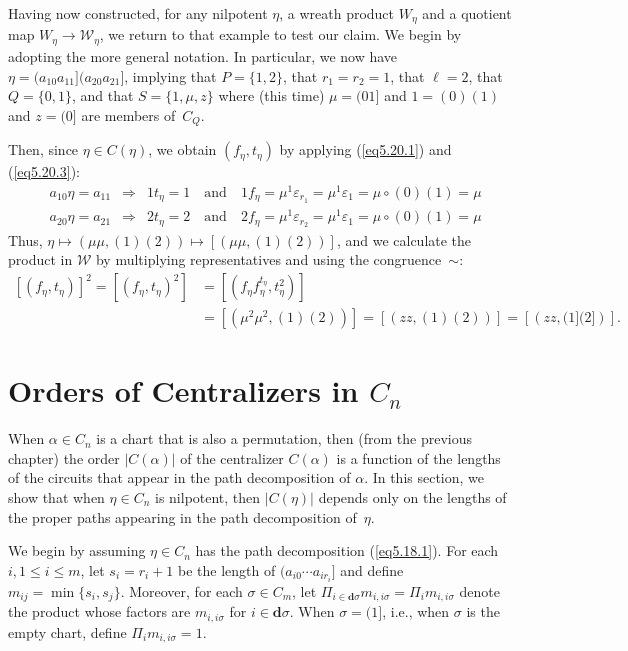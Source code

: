 \documentclass{surv-l}
\numberwithin{equation}{section}
\numberwithin{table}{section}
\numberwithin{figure}{section}
\theoremstyle{plain}
\theoremstyle{definition}
\begin{document}
Having now constructed, for any nilpotent $\eta$, a wreath product
$W_{\eta}$ and a quotient map $W_{\eta}\rightarrow
\mathcal{W}_{\eta}$, we return to that example to test our claim.
We begin by adopting the more general notation. In particular, we
now have $\eta=(a_{10}a_{11}](a_{20}a_{21}]$, implying that
$P=\{1,2\}$, that $r_{1}=r_{2}=1$, that $\ell=2$, that
$Q=\{0,1\}$, and that $S=\{1, \mu, z\}$ where (this time)
$\mu=(01]$ and $1=(0)(1)$ and $z=(0]$ are members of~$C_{Q}$.

Then, since $\eta\in C(\eta)$, we obtain $(f_{\eta}, t_{\eta})$ by
applying (\ref{eq5.20.1}) and (\ref{eq5.20.3}):
\begin{align*}
&a_{10}\eta=a_{11}\enspace \Rightarrow\enspace 1t_{\eta}=1\quad \mathrm{and}\quad 1 f_{\eta}=\mu^{1}\varepsilon_{r_{1}}=\mu^{1}\varepsilon_{1}=\mu\circ(0)(1)=\mu \\
&a_{20}\eta=a_{21}\enspace \Rightarrow\enspace 2t_{\eta}=2\quad \mathrm{and}\quad 2 f_{\eta}=\mu^{1}\varepsilon_{r_{2}}=\mu^{1}\varepsilon_{1}=\mu\circ(0)(1)=\mu
\end{align*}
Thus, $\eta\mapsto \left(\mu\mu,
(1)(2)\right)\mapsto\left[\left(\mu\mu,(1)(2)\right)\right]$, and
we calculate the product in $\mathcal{W}$ by multiplying
representatives and using the congruence~$\sim$:
\begin{align*}
\left[(f_{\eta}, t_{\eta})\right]^{2}=\left[(f_{\eta},
t_{\eta})^{2}\right]&=\left[(f_{\eta}f_{\eta}^{t_{\eta}}, t_{\eta}^{2})\right] \\
&=\left[(\mu^{2}\mu^{2}, (1)(2))\right] =\left[\left(zz, (1)(2)\right)\right]=\left[\left(zz, (1](2]\right)\right].
\end{align*}

\section{Orders of Centralizers in $C_{n}$}\label{sec5.22}

When $\alpha\in C_{n}$ is a chart that is also a permutation, then
(from the previous chapter) the order $|C(\alpha)|$ of the
centralizer $C(\alpha)$ is a
function of the lengths of the circuits that appear in the path
decomposition of $\alpha$. In this section, we show that when
$\eta\in C_{n}$ is nilpotent, then $|C(\eta)|$ depends only on the
lengths of the proper paths appearing in the path decomposition
of~$\eta$.

We begin by assuming $\eta\in C_{n}$ has the path decomposition
(\ref{eq5.18.1}). For each $i, 1\leq i\leq m$, let $s_{i}=r_{i}+1$
be the length of $(a_{i0}\cdots a_{ir_{i}}]$ and define
$m_{ij}=\min\{s_{i}, s_{j}\}$. Moreover, for each $\sigma\in
C_{m}$, let $\Pi_{i\in
\mathbf{d}\sigma}m_{i,i\sigma}=\Pi_{i}m_{i,i\sigma}$ denote the
product whose factors are $m_{i,i\sigma}$ for $ i\in
\mathbf{d}\sigma$. When $\sigma=(1]$, i.e., when $\sigma$ is the
empty chart, define $\Pi_{i}m_{i,i\sigma}=1$.
\end{document}
